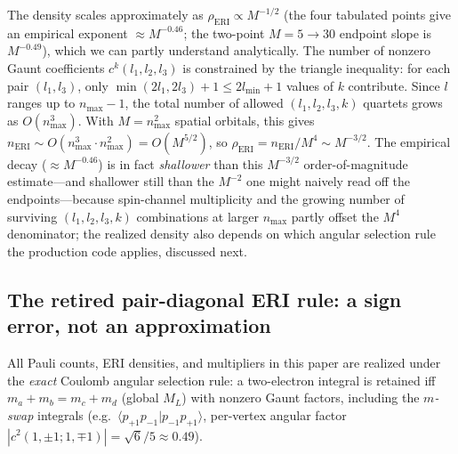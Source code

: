 \documentclass[aps,pra,twocolumn,superscriptaddress,longbibliography]{revtex4-2}
\newcommand{\gvq}[2]{#2}
\begin{document}
The density scales approximately as $\rho_{\mathrm{ERI}} \propto M^{-1/2}$
(the four tabulated points give an empirical exponent
$\approx M^{\gvq{eri_decay_4pt}{-0.46}}$; the two-point $M = 5 \to 30$
endpoint slope is $M^{\gvq{eri_decay_2pt}{-0.49}}$), which we can partly
understand analytically.
The number of nonzero Gaunt
coefficients $c^k(l_1, l_2, l_3)$ is constrained by the triangle
inequality: for each pair $(l_1, l_3)$, only
$\min(2l_1, 2l_3) + 1 \le 2l_{\min} + 1$ values of $k$ contribute.
Since $l$ ranges up to $n_{\max} - 1$, the total number of allowed
$(l_1, l_2, l_3, k)$ quartets grows as $O(n_{\max}^3)$.  With
$M = n_{\max}^2$ spatial orbitals, this gives
$n_{\mathrm{ERI}} \sim O(n_{\max}^3 \cdot n_{\max}^2) = O(M^{5/2})$,
so $\rho_{\mathrm{ERI}} = n_{\mathrm{ERI}} / M^4 \sim M^{-3/2}$.
The empirical decay ($\approx M^{\gvq{eri_decay_4pt}{-0.46}}$) is in fact
\emph{shallower} than this $M^{-3/2}$ order-of-magnitude estimate---and
shallower still than the $M^{-2}$ one might naively read off the
endpoints---because spin-channel multiplicity and the growing number of
surviving $(l_1, l_2, l_3, k)$ combinations at larger $n_{\max}$ partly
offset the $M^4$ denominator; the realized density also depends on which
angular selection rule the production code applies, discussed next.

\subsection{The retired pair-diagonal ERI rule: a sign error, not an approximation}
\label{sec:eri_rule}

All Pauli counts, ERI densities, and multipliers in this paper are
realized under the \emph{exact} Coulomb angular selection rule: a two-electron
integral is retained iff $m_a + m_b = m_c + m_d$ (global $M_L$) with nonzero
Gaunt factors, including the \emph{$m$-swap} integrals (e.g.\
$\langle p_{+1}p_{-1}|p_{-1}p_{+1}\rangle$, per-vertex angular factor
$|c^2(1,{\pm}1;1,{\mp}1)| = \sqrt{6}/5 \approx 0.49$).
\end{document}
